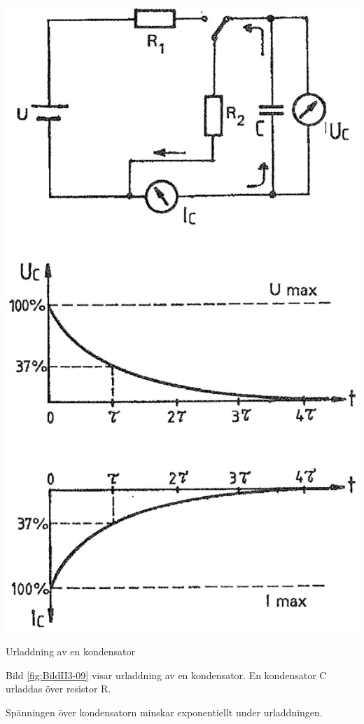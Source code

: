 \begin{marginfigure}%
  \includegraphics[width=\textwidth]{images/cropped_pdfs/bild_2_3-09.pdf}
  \caption{Urladdning av en kondensator}
  \label{fig:BildII3-09}
\end{marginfigure}

Bild \ref{fig:BildII3-09} visar urladdning av en kondensator.
En kondensator C urladdas över resistor R.

Spänningen över kondensatorn minskar exponentiellt under urladdningen.

